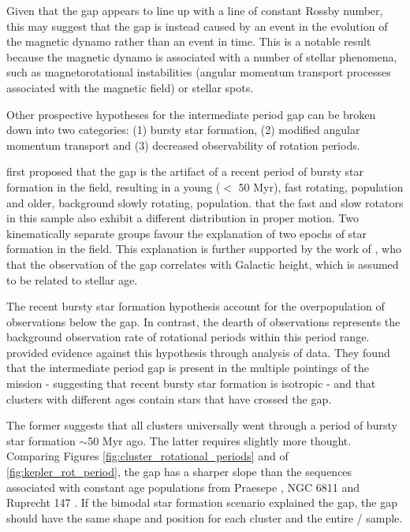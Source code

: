 Given that the gap appears to line up with a line of constant Rossby number, this may suggest that the gap is instead caused by an event in the evolution of the magnetic dynamo rather than an event in time.
This is a notable result because the magnetic dynamo is associated with a number of stellar phenomena, such as magnetorotational instabilities (angular momentum transport processes associated with the magnetic field) or stellar spots.

Other prospective hypotheses for the intermediate period gap can be broken down into two categories: (1) bursty star formation, (2) modified angular momentum transport and (3) decreased observability of rotation periods.

\citet{mcquillan_rotation_2014, davenport_rotating_2017} first proposed that the gap is the artifact of a recent period of bursty star formation in the \kepler{} field, resulting in a young ($<$ 50 Myr), fast rotating, population and older, background slowly rotating, population.
\citet{davenport_rotating_2017}  that the fast and slow rotators in this sample also exhibit a different distribution in proper motion. 
Two kinematically separate groups  favour the explanation of two epochs of star formation in the \kepler{} field. 
This explanation is further supported by the work of \citet{davenport_rotating_2018}, who  that the observation of the gap correlates with Galactic height, which is assumed to be related to stellar age.

The recent bursty star formation hypothesis  account for the overpopulation of observations below the gap. 
In contrast, the dearth of observations represents the background observation rate of rotational periods within this period range.
\citet{gordon_stellar_2021} provided evidence against this hypothesis through analysis of \ktoo{} data.
They found that the intermediate period gap is present in the multiple pointings of the \ktoo{} mission - suggesting that recent bursty star formation is isotropic -  and that clusters with different ages contain stars that have crossed the gap.

The former suggests that all clusters universally went through a period of bursty star formation $\sim$50 Myr ago. 
The latter requires slightly more thought. Comparing Figures \ref{fig:cluster_rotational_periods} and of \ref{fig:kepler_rot_period}, the gap has a sharper slope than the sequences associated with constant age populations from Praesepe \citep{douglas_poking_2017,douglas_k2_2019}, NGC 6811 \citep{curtis_temporary_2019} and Ruprecht 147 \citep{curtis_when_2020}. 
If the bimodal star formation scenario explained the gap, the gap should have the same shape and position for each cluster and the entire \ktoo/\kepler{} sample.



